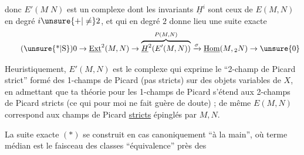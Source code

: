 \margin{\mbox{-- --}}

donc $E'(M\;N)$ est un complexe dont les invariants $\underline{H}^{i}$ sont ceux de $E(M,N)$ en degré $i\unsure{+|\ne}2$, et qui en degré $2$ donne lieu  une suite exacte
\begingroup
\makeatletter\tagsleft@true\makeatother
\[
\tag*{(\unsure{*|S})}
0\to\underline{\mathrm{Ext}}^{2}(M,N)\to
\overbrace{\underline{H}^{2}\!\left(E'(M,N)\right)}^{P(M,N)}
\xrightarrow{\sigma}\underline{\mathrm{Hom}}(M,{}_{2}N)\to \unsure{0}
\]
\endgroup

Heuristiquement, $E'(M,N)$ est le complexe qui exprime le ``2-champ de Picard strict'' formé des 1-champs de Picard (pas  stricts)  sur des objets variables de $X$, en admettant que ta théorie pour les 1-champs de Picard  s'étend aux 2-champs de Picard stricts (ce qui pour moi ne fait guère de doute) ; de même $E(M,N)$ correspond aux champs de Picard \uline{stricts} épinglés par $M,N$.

La suite exacte $(*)$ se construit en  cas canoniquement ``à la main'', où  terme médian est le faisceau des classes  ``équivalence'' près des


